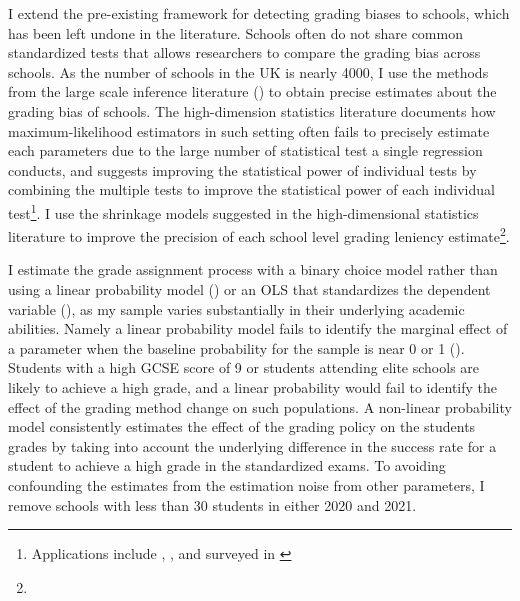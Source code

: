 I extend the pre-existing framework for detecting grading biases to schools, which has been left undone in the literature. Schools often do not share common standardized tests that allows researchers to compare the grading bias across schools. As the number of schools in the UK is nearly 4000, I use the methods from the large scale inference literature (\cite{Efron_2010}\cite{WALTERS2024183}) to obtain precise estimates about the grading bias of schools. The high-dimension statistics literature documents how maximum-likelihood estimators in such setting often fails to precisely estimate each parameters due to the large number of statistical test a single regression conducts, and suggests improving the statistical power of individual tests by combining the multiple tests to improve the statistical power of each individual test\footnote{Applications include \cite{10.1093/qje/qjab017}, \cite{Chetty2020}, and surveyed in \cite{WALTERS2024183}}. I use the shrinkage models suggested in the high-dimensional statistics literature to improve the precision of each school level grading leniency estimate\footnote{}.


I estimate the grade assignment process with a binary choice model rather than using a linear probability model (\cite{dee2019}) or an OLS that standardizes the dependent variable (\cite{lavy2009}), as my sample varies substantially in their underlying academic abilities. Namely a linear probability model fails to identify the marginal effect of a parameter when the baseline probability for the sample is near 0 or 1 (\cite{repec:mtp:titles:0262232197}). Students with a high GCSE score of 9 or students attending elite schools are likely to achieve a high grade, and a linear probability would fail to identify the effect of the grading method change on such populations. A non-linear probability model consistently estimates the effect of the grading policy on the students grades by taking into account the underlying difference in the success rate for a student to achieve a high grade in the standardized exams. 
To avoiding confounding the estimates from the estimation noise from other parameters, I remove schools with less than 30 students in either 2020 and 2021.



